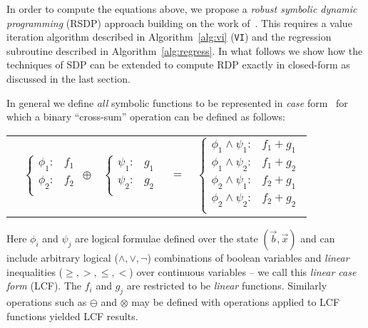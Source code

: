 In order to compute the equations above, we propose a \emph{robust
symbolic dynamic programming} (RSDP) approach building on the
work of~\cite{aaai_sdp,sanner_uai11}.  This requires a value iteration
algorithm described in Algorithm~\ref{alg:vi} (\texttt{VI}) and the
regression subroutine described in Algorithm~\ref{alg:regress}.  In what
follows we show how the techniques of SDP can be extended to compute RDP
exactly in closed-form as discussed in the last section.

In general we define \emph{all} symbolic functions to be represented
in \emph{case} form~\cite{fomdp} for which a binary ``cross-sum'' operation
can be defined as follows:
{\footnotesize 
\begin{center}
\begin{tabular}{r c c c l}
&
\hspace{-6mm} 
  $\begin{cases}
    \phi_1: & f_1 \\ 
    \phi_2: & f_2 \\ 
  \end{cases}$
$\oplus$
&
\hspace{-4mm}
  $\begin{cases}
    \psi_1: & g_1 \\ 
    \psi_2: & g_2 \\ 
  \end{cases}$
&
\hspace{-2mm} 
$ = $
&
\hspace{-2mm}
  $\begin{cases}
  \phi_1 \wedge \psi_1: & f_1 + g_1 \\ 
  \phi_1 \wedge \psi_2: & f_1 + g_2 \\ 
  \phi_2 \wedge \psi_1: & f_2 + g_1 \\ 
  \phi_2 \wedge \psi_2: & f_2 + g_2 \\ 
  \end{cases}$
\end{tabular}
\end{center}
}
\normalsize
Here $\phi_i$ and $\psi_j$ are logical formulae defined over the state
$(\vec{b},\vec{x})$ and can include arbitrary logical
($\land,\lor,\neg$) combinations of boolean variables
and \emph{linear} inequalities ($\geq,>,\leq,<$) over continuous
variables -- we call this \emph{linear case form} (LCF).  The $f_i$
and $g_j$ are restricted to be \emph{linear} functions.  Similarly
operations such as $\ominus$ and $\otimes$ may be defined with operations
applied to LCF functions yielded LCF results.

